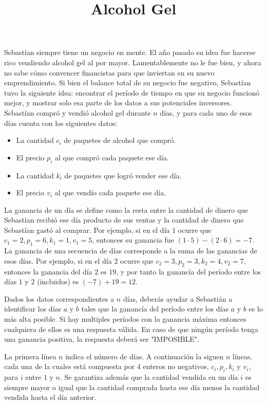 \documentclass{oci}
\title{Alcohol Gel}
\begin{document}
\begin{problemDescription}
Sebastían siempre tiene un negocio en mente. El año pasado su idea fue hacerse rico vendiendo alcohol gel al por mayor. Lamentablemente no le fue bien, y ahora no sabe cómo convencer financistas para que inviertan en su nuevo emprendimiento.
 Si bien el balance total de su negocio fue negativo, Sebastían tuvo la siguiente idea: encontrar el período de tiempo en que su negocio funcionó mejor, y mostrar solo esa parte de los datos a sus potenciales inversores. 
Sebastían compró y vendió alcohol gel durante $n$ días, y para cada uno de esos días cuenta con los siguientes datos:
\begin{itemize}
	\item La cantidad $c_i$ de paquetes de alcohol que compró. 
	\item El precio $p_i$ al que compró cada paquete ese día.
	\item La cantidad $k_i$ de paquetes que logró vender ese día.
	\item El precio $v_i$ al que vendío cada paquete ese día.
\end{itemize}

La ganancia de un día se define como la resta entre la cantidad de dinero que Sebastían recibió ese día producto de sus ventas y la cantidad de dinero que Sebastían gastó al comprar. Por ejemplo, si en el día $1$ ocurre que $c_1 = 2, p_1 = 6, k_1=1, v_1=5$, entonces su ganancia fue $(1 \cdot 5) - (2 \cdot 6) = -7$.
 La ganancia de una secuencia de días corresponde a la suma de las ganancias de esos días. Por ejemplo, si en el día $2$ ocurre que $c_2 = 3, p_2 = 3, k_2=4, v_2=7$, entonces la ganancia del día $2$ es $19$, y por tanto la ganancía del período entre los días $1$ y $2$ (incluidos) es $(-7) + 19 = 12$.

Dados los datos correspondientes a $n$ días, deberás ayudar a Sebastián a identificar los días $a$ y $b$ tales que la ganancía del período entre los días $a$ y $b$ es lo más alta posible. Si hay multiples períodos con la ganancia máxima entonces cualquiera de ellos es una respuesta válida. En caso de que ningún período tenga una ganancia positiva, la respuesta deberá ser "IMPOSIBLE".

\end{problemDescription}

\begin{inputDescription}
La primera línea $n$ indica el número de días. A continuación la siguen $n$ líneas, cada una de la cuales está compuesta por $4$ enteros no negativos, $c_i, p_i, k_i$ y $v_i$, para $i$ entre $1$ y $n$. Se garantiza además que la cantidad vendida en un día $i$ 
es siempre mayor o igual que la cantidad comprada hasta ese día menos la cantidad vendida hasta el día anterior.
\end{inputDescription}
\end{document}
